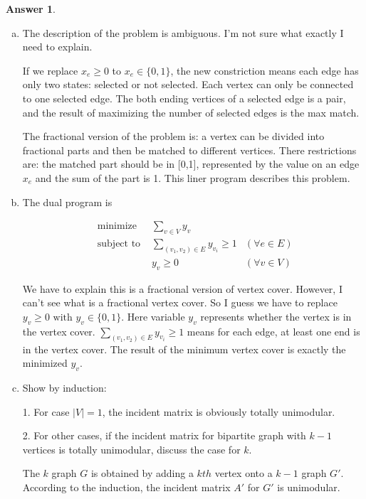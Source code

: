\documentclass{article}
\theoremstyle{definition}
\newtheorem{ans}{Answer}
\begin{document}
	\begin{ans}
		~
		
		\begin{enumerate}[(a)]
			\item The description of the problem is ambiguous. I'm not sure what exactly I need to explain. 
			
			If we replace $x_{e} \geq 0$ to $x_{e} \in\{0,1\}$, the new constriction means each edge has only two states: selected or not selected. Each vertex can only be connected to one selected edge. The both ending vertices of a selected edge is a pair, and the result of maximizing the number of selected edges is the max match. 
			
			The fractional version of the problem is: a vertex can be divided into fractional parts and then be matched to different vertices. There restrictions are: the matched part should be in [0,1], represented by the value on an edge $x_e$ and the sum of the part is 1. This liner program describes this problem. 
			
			\item The dual program is 
			
			$$
			\begin{aligned}
				\text { minimize } & \sum_{v \in V} y_{v} \\
				\text { subject to } & \sum_{(v_1,v_2) \in E} y_{v_i} \geq 1 & (\forall e \in E) \\
				& y_{v} \geq 0 & (\forall v \in V)
			\end{aligned}
			$$
			
			We have to explain this is a fractional version of vertex cover. However, I can't see what is a fractional vertex cover. So I guess we have to replace $y_v\geq0 \text{ with } y_v\in\{0,1\}$. Here variable $y_v$ represents whether the vertex is in the vertex cover. $\sum_{(v_1,v_2) \in E} y_{v_i} \geq 1$ means for each edge, at least one end is in the vertex cover. The result of the minimum vertex cover is exactly the minimized $y_v$. 
			
			\item Show by induction:
			
			1. For case $|V|=1$, the incident matrix is obviously totally unimodular. 
			
			2. For other cases, if the incident matrix for bipartite graph with $k-1$ vertices is totally unimodular, discuss the case for $k$.
			
			The $k$ graph $G$ is obtained by adding a $kth$ vertex onto a $k-1$ graph $G'$. According to the induction, the incident matrix $A'$ for $G'$ is unimodular. 
			

\end{enumerate}
\end{ans}
\end{document}

